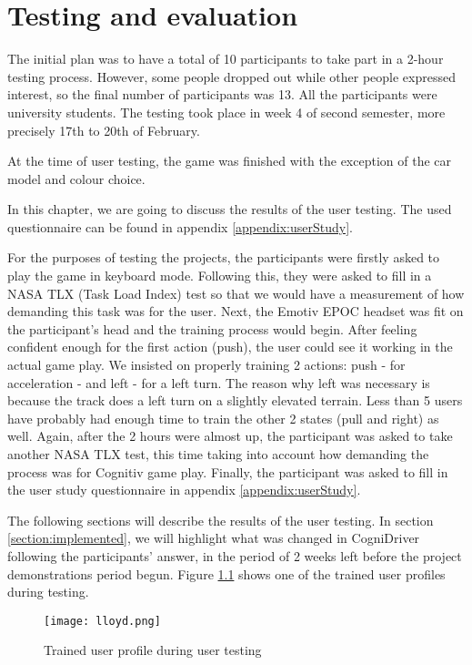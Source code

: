 \chapter{Testing and evaluation}
\label{cha:testing}

The initial plan was to have a total of 10 participants to take part in a 2-hour testing process. However, some people dropped out while other people expressed interest, so the final number of participants was 13. All the participants were university students. The testing took place in week 4 of second semester, more precisely 17th to 20th of February.

At the time of user testing, the game was finished with the exception of the car model and colour choice.

In this chapter, we are going to discuss the results of the user testing. The used questionnaire can be found in appendix \ref{appendix:userStudy}. 

For the purposes of testing the projects, the participants were firstly asked to play the game in keyboard mode. Following this, they were asked to fill in a NASA TLX (Task Load Index) test so that we would have a measurement of how demanding this task was for the user. Next, the Emotiv EPOC headset was fit on the participant's head and the training process would begin. After feeling confident enough for the first action (push), the user could see it working in the actual game play. We insisted on properly training 2 actions: push - for acceleration - and left - for a left turn. The reason why left was necessary is because the track does a left turn on a slightly elevated terrain. Less than 5 users have probably had enough time to train the other 2 states (pull and right) as well. Again, after the 2 hours were almost up, the participant was asked to take another NASA TLX test, this time taking into account how demanding the process was for Cognitiv game play. Finally, the participant was asked to fill in the user study questionnaire in appendix \ref{appendix:userStudy}. 

The following sections will describe the results of the user testing. In section \ref{section:implemented}, we will highlight what was changed in CogniDriver following the participants' answer, in the period of 2 weeks left before the project demonstrations period begun. Figure \ref{fig:testing} shows one of the trained user profiles during testing.

\begin{figure}
  \centering
  \texttt{[image: lloyd.png]}
  \caption{Trained user profile during user testing}
    \label{fig:testing}           
\end{figure}

